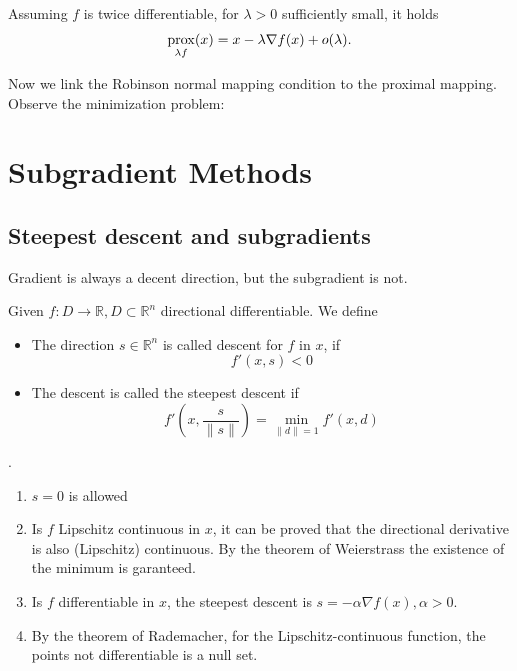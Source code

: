 \begin{corollary}
Assuming $f$ is twice differentiable, for $\lambda > 0$ sufficiently small, it holds
\begin{align*}
	\operatorname*{prox}_{\lambda f}(x) = x - \lambda \nabla f (x) + o(\lambda). 
\end{align*}
\end{corollary}

Now we link the Robinson normal mapping condition to the proximal mapping. Observe the minimization problem:



\section{Subgradient Methods}
\subsection{Steepest descent and subgradients}
Gradient is always a decent direction, but the subgradient is not. 

\begin{definition}
	Given $f: D \longrightarrow \mathbb{R}, D \subset \mathbb{R}^n$ directional differentiable. We define
	\begin{itemize}
		\item The direction $s \in \mathbb{R}^n$ is called descent for $f$ in $x$, if 
			\begin{equation*}
				f'(x,s) < 0
			\end{equation*}
		\item The descent is called the steepest descent if
			\begin{equation*}
				f'(x, \frac{s}{\|s\|}) = \min_{\| d \| = 1}f'(x, d)
			\end{equation*}
	\end{itemize} 
\end{definition}

\begin{remark}.
	\begin{enumerate}
		\item $s = 0$ is allowed
		\item Is $f$ Lipschitz continuous in $x$, it can be proved that the directional derivative is also (Lipschitz) continuous. By the theorem of Weierstrass the existence of the minimum is garanteed. 
		\item Is $f$ differentiable in $x$, the steepest descent is $s = - \alpha \nabla f(x), \alpha > 0$.
		\item By the theorem of Rademacher, for the Lipschitz-continuous function, the points not differentiable is a null set.
	\end{enumerate}
\end{remark}

